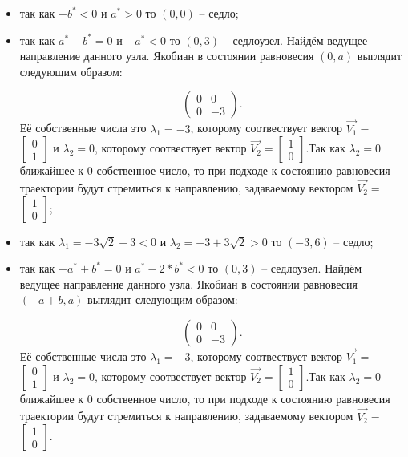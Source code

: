 \begin{itemize}
	\item{ так как $-b^\ast  < 0 $ и $a^\ast > 0 $ то $(0, 0)$ -- седло;}
	\item{ так как $a^\ast - b^\ast = 0 $ и $-a^\ast  < 0 $ то $(0, 3)$ -- седлоузел. Найдём ведущее направление данного узла. Якобиан в состоянии равновесия $(0, a)$ выглядит следующим образом:
		
		$$\begin{pmatrix}0 & 0\\0 & -3\end{pmatrix}. $$Её собственные числа это $\lambda_1=-3$, которому соотвествует вектор $\Vec{V_1}=$ $\left[\begin{matrix}0\\1\end{matrix}\right]$ и $\lambda_2=0$, которому соотвествует вектор $\Vec{V_2}=$$\left[\begin{matrix}1\\0\end{matrix}\right]$.Так как $\lambda_2=0$ ближайшее к $0$ собственное число, то при подходе к состоянию равновесия траектории будут стремиться к направлению, задаваемому вектором $\Vec{V_2}=$ $\left[\begin{matrix}1\\0\end{matrix}\right]$;}
	\item{ так как ${\lambda_{1}} = - 3 \sqrt{2} - 3$$  < 0 $ и ${\lambda_{2}} = -3 + 3 \sqrt{2}$$ > 0 $ то $(-3, 6)$ -- седло;}
	\item{ так как $-a^\ast + b^\ast = 0 $ и $a^\ast - 2*b^\ast  < 0 $ то $(0, 3)$ -- седлоузел. Найдём ведущее направление данного узла. Якобиан в состоянии равновесия $(-a + b, a)$ выглядит следующим образом:
		
		$$\begin{pmatrix}0 & 0\\0 & -3\end{pmatrix}. $$Её собственные числа это $\lambda_1=-3$, которому соотвествует вектор $\Vec{V_1}=$ $\left[\begin{matrix}0\\1\end{matrix}\right]$ и $\lambda_2=0$, которому соотвествует вектор $\Vec{V_2}=$$\left[\begin{matrix}1\\0\end{matrix}\right]$.Так как $\lambda_2=0$ ближайшее к $0$ собственное число, то при подходе к состоянию равновесия траектории будут стремиться к направлению, задаваемому вектором $\Vec{V_2}=$ $\left[\begin{matrix}1\\0\end{matrix}\right]$.}
\end{itemize} 

